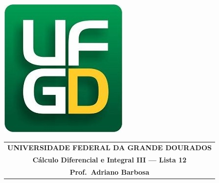 \documentclass[a4paper,5pt]{amsbook}
\begin{document}
\thispagestyle{empty}
\pagestyle{empty}
\begin{minipage}[h]{0.14\textwidth}
	\includegraphics[scale=0.24]{../../ufgd.png}
\end{minipage}
\begin{minipage}[h]{\textwidth}
\begin{tabular}{c}
{{\bf UNIVERSIDADE FEDERAL DA GRANDE DOURADOS}}\\
{{\bf C\'alculo Diferencial e Integral III --- Lista 12}}\\
{{\bf Prof.\ Adriano Barbosa}}\\
\end{tabular}
\vspace{-0.45cm}
%
\end{minipage}

\end{document}
